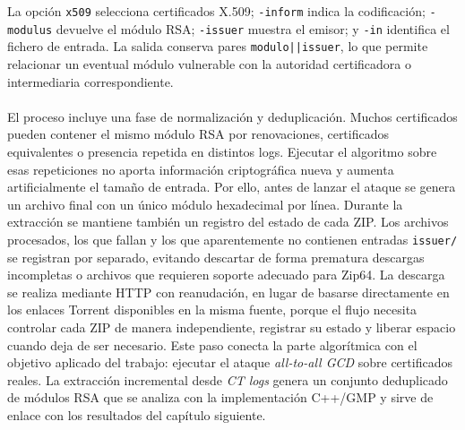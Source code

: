 La opción \texttt{x509} selecciona certificados X.509; \texttt{-inform} indica la codificación; \texttt{-modulus} devuelve el módulo RSA; \texttt{-issuer} muestra el emisor; y \texttt{-in} identifica el fichero de entrada. La salida conserva pares \texttt{modulo||issuer}, lo que permite relacionar un eventual módulo vulnerable con la autoridad certificadora o intermediaria correspondiente.
\\
\\
El proceso incluye una fase de normalización y deduplicación. Muchos certificados pueden contener el mismo módulo RSA por renovaciones, certificados equivalentes o presencia repetida en distintos logs. Ejecutar el algoritmo sobre esas repeticiones no aporta información criptográfica nueva y aumenta artificialmente el tamaño de entrada. Por ello, antes de lanzar el ataque se genera un archivo final con un único módulo hexadecimal por línea. Durante la extracción se mantiene también un registro del estado de cada ZIP. Los archivos procesados, los que fallan y los que aparentemente no contienen entradas \texttt{issuer/} se registran por separado, evitando descartar de forma prematura descargas incompletas o archivos que requieren soporte adecuado para Zip64. La descarga se realiza mediante HTTP con reanudación, en lugar de basarse directamente en los enlaces Torrent disponibles en la misma fuente, porque el flujo necesita controlar cada ZIP de manera independiente, registrar su estado y liberar espacio cuando deja de ser necesario. Este paso conecta la parte algorítmica con el objetivo aplicado del trabajo: ejecutar el ataque \textit{all-to-all GCD} sobre certificados reales. La extracción incremental desde \textit{CT logs} genera un conjunto deduplicado de módulos RSA que se analiza con la implementación C++/GMP y sirve de enlace con los resultados del capítulo siguiente.
